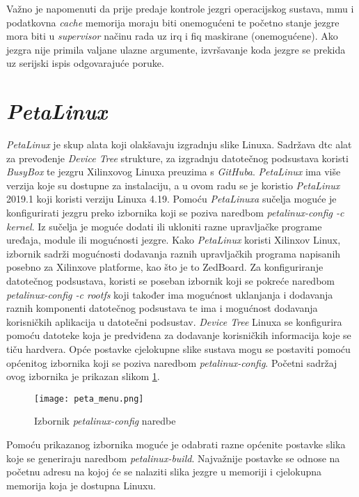 \documentclass[times, utf8, diplomski, numeric]{fer}
\begin{document}
Važno je napomenuti da prije predaje kontrole jezgri operacijskog sustava, \gls{mmu} i podatkovna \textit{cache} memorija moraju biti
onemogućeni te početno stanje jezgre mora biti u \textit{supervisor} načinu rada uz \gls{irq} i \gls{fiq} maskirane (onemogućene). Ako
jezgra nije primila valjane ulazne argumente, izvršavanje koda jezgre se prekida uz serijski ispis odgovarajuće poruke.

\section{\textit{PetaLinux}}
\textit{PetaLinux} je skup alata koji olakšavaju izgradnju slike Linuxa. Sadržava \gls{dtc} alat za prevođenje \textit{Device Tree}
strukture, za izgradnju datotečnog podsustava koristi \textit{BusyBox} te jezgru Xilinxovog Linuxa preuzima s \textit{GitHuba}.
\textit{PetaLinux} ima više verzija koje su dostupne za instalaciju, a u ovom radu se je koristio \textit{PetaLinux} 2019.1 koji
koristi verziju Linuxa 4.19. Pomoću \textit{PetaLinuxa} sučelja moguće je konfigurirati jezgru preko izbornika koji se poziva
naredbom \textit{petalinux-config -c kernel}. Iz sučelja je moguće dodati ili ukloniti razne upravljačke programe uređaja,
module ili mogućnosti jezgre. Kako \textit{PetaLinux} koristi Xilinxov Linux, izbornik sadrži mogućnosti dodavanja raznih
upravljačkih programa napisanih posebno za Xilinxove platforme, kao što je to ZedBoard. Za konfiguriranje datotečnog podsustava,
koristi se poseban izbornik koji se pokreće naredbom \textit{petalinux-config -c rootfs} koji također ima mogućnost uklanjanja
i dodavanja raznih komponenti datotečnog podsustava te ima i mogućnost dodavanja korisničkih aplikacija u datotečni  podsustav.
\textit{Device Tree} Linuxa se konfigurira pomoću datoteke koja je predviđena za dodavanje korisničkih informacija koje se tiču
hardvera. Opće postavke cjelokupne slike sustava mogu se postaviti pomoću općenitog izbornika koji se poziva naredbom
\textit{petalinux-config}. Početni sadržaj ovog izbornika je prikazan slikom \ref{peta_menu}.
\begin{figure}[H]
  \centering
	\texttt{[image: peta\_menu.png]}%
	\caption{Izbornik \textit{petalinux-config} naredbe}
	\label{peta_menu}%
\end{figure}
Pomoću prikazanog izbornika
moguće je odabrati razne općenite postavke slika koje se generiraju naredbom \textit{petalinux-build}. Najvažnije postavke
se odnose na početnu adresu na kojoj će se nalaziti slika jezgre u memoriji i cjelokupna memorija koja je dostupna Linuxu.
\end{document}
